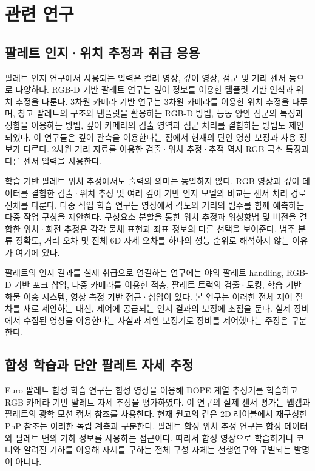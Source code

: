 \section{관련 연구}\label{sec:related}
\subsection{팔레트 인지·위치 추정과 취급 응용}
팔레트 인지 연구에서 사용되는 입력은 컬러 영상, 깊이 영상, 점군 및 거리 센서 등으로 다양하다. RGB-D 기반 팔레트 연구는 깊이 정보를 이용한 템플릿 기반 인식과 위치 추정을 다룬다\cite{xiao2017}. 3차원 카메라 기반 연구는 3차원 카메라를 이용한 위치 추정을 다루며\cite{molter2018}, 창고 팔레트의 구조와 템플릿을 활용하는 RGB-D 방법\cite{zhao2022}, 능동 양안 점군의 특징과 정합을 이용하는 방법\cite{shao2023}, 깊이 카메라의 검출 영역과 점군 처리를 결합하는 방법\cite{hu2025}도 제안되었다. 이 연구들은 깊이 관측을 이용한다는 점에서 현재의 단안 영상 보정과 사용 정보가 다르다. 2차원 거리 자료를 이용한 검출·위치 추정·추적\cite{mohamed2020} 역시 RGB 국소 특징과 다른 센서 입력을 사용한다.

학습 기반 팔레트 위치 추정에서도 출력의 의미는 동일하지 않다. RGB 영상과 깊이 데이터를 결합한 검출·위치 추정\cite{li2021} 및 여러 깊이 기반 인지 모델의 비교\cite{rocha2023}는 센서 처리 경로 전체를 다룬다. 다중 작업 학습 연구는 영상에서 각도와 거리의 범주를 함께 예측하는 다중 작업 구성을 제안한다\cite{mok2021}. 구성요소 분할을 통한 위치 추정\cite{wu2025}과 위성항법 및 비전을 결합한 위치·회전 추정\cite{meng2024}은 각각 물체 표현과 좌표 정보의 다른 선택을 보여준다. 범주 분류 정확도, 거리 오차 및 전체 6D 자세 오차를 하나의 성능 순위로 해석하지 않는 이유가 여기에 있다.

팔레트의 인지 결과를 실제 취급으로 연결하는 연구에는 야외 팔레트 handling\cite{iinuma2020}, RGB-D 기반 포크 삽입\cite{iinuma2021d}, 다중 카메라를 이용한 적층\cite{iinuma2021s}, 팔레트 트럭의 검출·도킹\cite{tsiogas2021}, 학습 기반 화물 이송 시스템\cite{ren2022}, 영상 측정 기반 접근·삽입\cite{kita2026}이 있다. 본 연구는 이러한 전체 제어 절차를 새로 제안하는 대신, 제어에 공급되는 인지 결과의 보정에 초점을 둔다. 실제 장비에서 수집된 영상을 이용한다는 사실과 제안 보정기로 장비를 제어했다는 주장은 구분한다.

\subsection{합성 학습과 단안 팔레트 자세 추정}
Euro 팔레트 합성 학습 연구는 합성 영상을 이용해 DOPE 계열 추정기를 학습하고 RGB 카메라 기반 팔레트 자세 추정을 평가하였다\cite{knitt2022}. 이 연구의 실제 센서 평가는 웹캠과 팔레트의 광학 모션 캡처 참조를 사용한다. 현재 원고의 같은 2D 레이블에서 재구성한 PnP 참조는 이러한 독립 계측과 구분한다. 팔레트 합성 위치 추정 연구는 합성 데이터와 팔레트 면의 기하 정보를 사용하는 접근이다\cite{mueller2024}. 따라서 합성 영상으로 학습하거나 코너와 알려진 기하를 이용해 자세를 구하는 전체 구성 자체는 선행연구와 구별되는 발명이 아니다.

